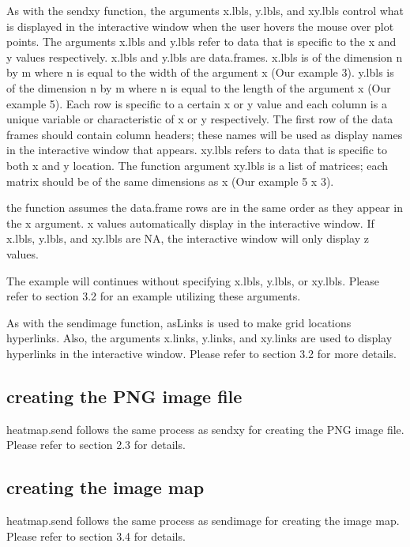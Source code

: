 \documentclass[]{article}
\begin{document}
\indent As with the sendxy function, the arguments x.lbls, y.lbls, and xy.lbls control what is displayed in the interactive window when the user hovers the mouse over plot points. The arguments x.lbls and y.lbls refer to data that is specific to the x and y values respectively. x.lbls and y.lbls are data.frames. x.lbls is of the dimension n by m where n is equal to the width of the argument x (Our example 3). y.lbls is of the dimension n by m where n is equal to the length of the argument x (Our example 5). Each row is specific to a certain x or y value and each column is a unique variable or characteristic of x or y respectively.  The first row of the data frames should contain column headers; these names will be used as display names in the interactive window that appears. xy.lbls refers to data that is specific to both x and y location. The function argument xy.lbls is a list of matrices; each matrix should be of the same dimensions as x (Our example 5 x 3).

 the function assumes the data.frame rows are in the same order as they appear in the x argument.  \newline
{} x values automatically display in the interactive window. If x.lbls, y.lbls, and xy.lbls are NA, the interactive window will only display z values. \newline

\indent The example will continues without specifying x.lbls, y.lbls, or xy.lbls. Please refer to section 3.2 for an example utilizing these arguments. 

\indent As with the sendimage function, asLinks is used to make grid locations hyperlinks. Also, the arguments x.links, y.links, and xy.links are used to display hyperlinks in the interactive window. Please refer to section 3.2 for more details. 

\subsection{creating the PNG image file}

\indent heatmap.send follows the same process as sendxy for creating the PNG image file. Please refer to section 2.3 for details.

\subsection{creating the image map}

\indent heatmap.send follows the same process as sendimage for creating the image map. Please refer to section 3.4 for details.
\end{document}
